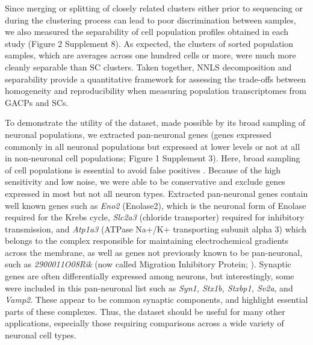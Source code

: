 Since merging or splitting of closely related clusters either prior to sequencing or during the clustering process can lead to poor discrimination between samples, we also measured the separability of cell population profiles obtained in each study (Figure 2 Supplement 8). As expected, the clusters of sorted population samples, which are averages across one hundred cells or more, were much more cleanly separable than SC clusters. Taken together, NNLS decomposition and separability provide a quantitative framework for assessing the trade-offs between homogeneity and reproducibility when measuring population transcriptomes from GACPs and SCs. 

To demonstrate the utility of the dataset, made possible by its broad sampling of neuronal  populations, we extracted pan-neuronal genes (genes expressed commonly in all neuronal  populations but expressed at lower levels or not at all in non-neuronal cell populations; Figure 1 Supplement 3). Here, broad sampling of cell populations is essential to avoid false positives \citep{Zhang_2014,Mo_2015,Stefanakis_2015}. Because of the high sensitivity and low noise, we were able to be conservative and exclude genes expressed in most but not all neuron types. Extracted pan-neuronal genes contain well known genes such as \textit{Eno2} (Enolase2), which is the neuronal form of Enolase required for the Krebs cycle, \textit{Slc2a3} (chloride transporter) required for inhibitory transmission, and \textit{Atp1a3} (ATPase Na+/K+ transporting subunit alpha 3) which belongs to the complex responsible for maintaining electrochemical gradients across the membrane, as well as genes not previously known to be pan-neuronal, such as \textit{2900011O08Rik} (now called Migration Inhibitory Protein; \citealt{Zhang_2014a}). Synaptic genes are often differentially expressed among neurons, but interestingly, some were included in this pan-neuronal list such as \textit{Syn1, Stx1b, Stxbp1, Sv2a}, and \textit{Vamp2}. These appear to be common synaptic components, and highlight essential parts of these complexes. Thus, the dataset should be useful for many other applications, especially those requiring comparisons across a wide variety of neuronal cell types. 

